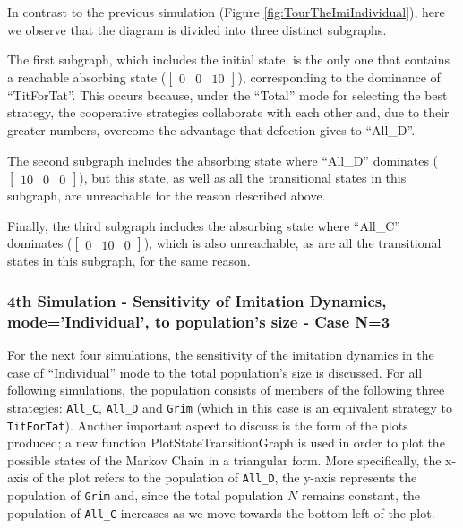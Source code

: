 In contrast to the previous simulation (Figure \ref{fig:TourTheImiIndividual}), here we observe that the diagram is divided into three distinct subgraphs.

The first subgraph, which includes the initial state, is the only one that contains a reachable absorbing state ($\begin{bmatrix}0 & 0 & 10\end{bmatrix}$), corresponding to the dominance of ``TitForTat''. This occurs because, under the ``Total'' mode for selecting the best strategy, the cooperative strategies collaborate with each other and, due to their greater numbers, overcome the advantage that defection gives to ``All\_D''.

The second subgraph includes the absorbing state where ``All\_D'' dominates ($\begin{bmatrix}10 & 0 & 0\end{bmatrix}$), but this state, as well as all the transitional states in this subgraph, are unreachable for the reason described above.

Finally, the third subgraph includes the absorbing state where ``All\_C'' dominates ($\begin{bmatrix}0 & 10 & 0\end{bmatrix}$), which is also unreachable, as are all the transitional states in this subgraph, for the same reason. 

\subsubsection{4th Simulation - Sensitivity of Imitation Dynamics, mode='Individual', to population's size - Case N=3}
For the next four simulations, the sensitivity of the imitation dynamics in the case of ``Individual'' mode to the total population's size is discussed. For all following simulations, the population consists of members of the following three strategies: \texttt{All\_C}, \texttt{All\_D} and \texttt{Grim} (which in this case is an equivalent strategy to \texttt{TitForTat}). Another important aspect to discuss is the form of the plots produced; a new function PlotStateTransitionGraph is used in order to plot the possible states of the Markov Chain in a triangular form. More specifically, the x-axis of the plot refers to the population of \texttt{All\_D}, the y-axis represents the population of \texttt{Grim} and, since the total population $N$ remains constant, the population of \texttt{All\_C} increases as we move towards the bottom-left of the plot. 

